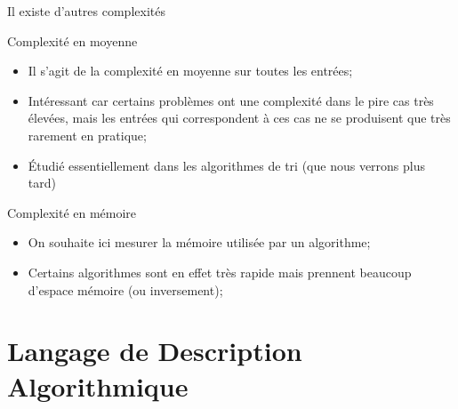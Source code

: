 \documentclass[10pt,xcolor=dvipsnames]{beamer}
\begin{document}
\begin{frame}{Il existe d'autres complexités}
    \begin{alertblock}{Complexité en moyenne}
    \begin{itemize}
        \item Il s'agit de la complexité en moyenne sur toutes les entrées;
        \item Intéressant car certains problèmes ont une complexité dans le pire cas très élevées, mais les entrées qui correspondent à ces cas ne se produisent que très rarement en pratique;
        \item Étudié essentiellement dans les algorithmes de tri (que nous verrons plus tard)
    \end{itemize}
    \end{alertblock}
    
        \begin{alertblock}{Complexité en mémoire}
    \begin{itemize}
        \item On souhaite ici mesurer la mémoire utilisée par un algorithme;
        \item Certains algorithmes sont en effet très rapide mais prennent beaucoup d'espace mémoire (ou inversement);
    \end{itemize}
    \end{alertblock}
%     
\end{frame}

\section{Langage de Description Algorithmique}


%  
%  
\end{document}
